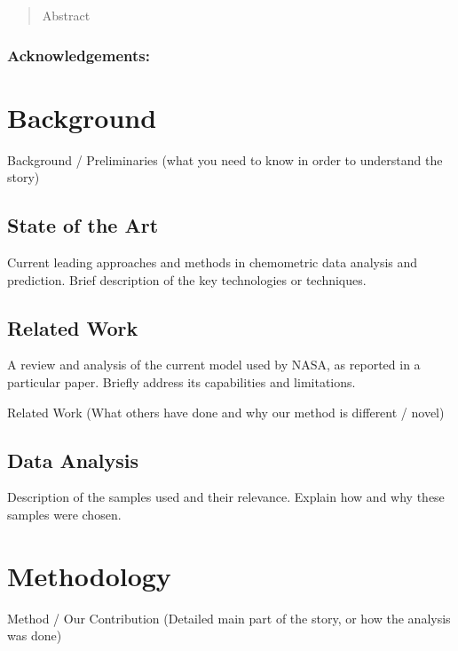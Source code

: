 
\newpage

\begin{abstract}
Abstract
\end{abstract}

\maketitle

\subsubsection*{Acknowledgements:}




\section{Background}
Background / Preliminaries (what you need to know in order to understand the story)
\subsection{State of the Art}
Current leading approaches and methods in chemometric data analysis and prediction.
Brief description of the key technologies or techniques.

\subsection{Related Work}
A review and analysis of the current model used by NASA, as reported in a particular paper.
Briefly address its capabilities and limitations.

Related Work (What others have done and why our method is different / novel)

\subsection{Data Analysis}
Description of the samples used and their relevance.
Explain how and why these samples were chosen.

\section{Methodology}
Method / Our Contribution (Detailed main part of the story, or how the analysis was done)

